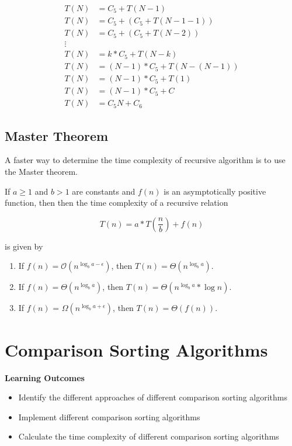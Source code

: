 \begin{align*}
    T(N) & = C_5+T(N-1)           \\
    T(N) & = C_5+(C_5+T(N-1-1))   \\
    T(N) & = C_5+(C_5+T(N-2))     \\
    \vdots                        \\
    T(N) & = k*C_5+T(N-k)         \\
    T(N) & = (N-1)*C_5+T(N-(N-1)) \\
    T(N) & = (N-1)*C_5+T(1)       \\
    T(N) & = (N-1)*C_5+C          \\
    T(N) & = C_5N + C_6
\end{align*}

\subsection{Master Theorem}
A faster way to determine the time complexity of recursive algorithm is to use the Master theorem.

If $a \geq 1$ and $b > 1$ are constants and $f(n)$ is an asymptotically positive function, then  then the time complexity of a recursive relation

\[
    T(n) = a*T(\frac{n}{b}) + f(n)
\]

is given by

\begin{enumerate}
    \item If $f(n) = \mathcal{O}(n^{\log_b a-\epsilon})$, then $T(n) = \Theta(n^{\log_b a})$.
    \item If $f(n) = \Theta(n^{\log_b a})$, then $T(n) = \Theta(n^{\log_b a} * \log n)$.
    \item If $f(n)$ = $\Omega(n^{\log_b a+\epsilon})$, then $T(n) = \Theta(f(n))$.
\end{enumerate}



\section{Comparison Sorting Algorithms}
\begin{mdframed}
    \textbf{Learning Outcomes}
    \begin{itemize}[label={\checkmark}]
        \item Identify the different approaches of different comparison sorting algorithms
        \item Implement different comparison sorting algorithms
        \item Calculate the time complexity of different comparison sorting algorithms
    \end{itemize}
\end{mdframed}

